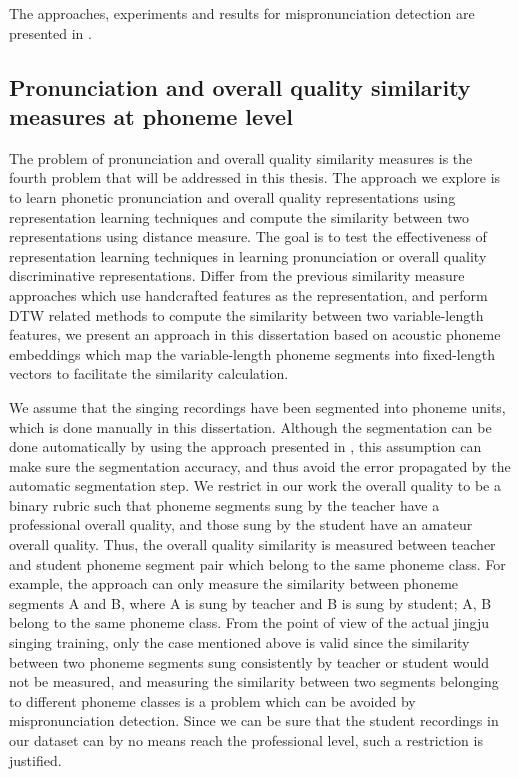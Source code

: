 The approaches, experiments and results for mispronunciation detection are presented in .

\subsection{Pronunciation and overall quality similarity measures at phoneme level}\label{sec:ch3:similarity_formulation}

The problem of pronunciation and overall quality similarity measures is the fourth problem that will be addressed in this thesis. The approach we explore is to learn phonetic pronunciation and overall quality representations using representation learning techniques and compute the similarity between two representations using distance measure. The goal is to test the effectiveness of representation learning techniques in learning pronunciation or overall quality discriminative representations. Differ from the previous similarity measure approaches which use handcrafted features as the representation, and perform \gls{DTW} related methods to compute the similarity between two variable-length features, we present an approach in this dissertation based on acoustic phoneme embeddings which map the variable-length phoneme segments into fixed-length vectors to facilitate the similarity calculation.

We assume that the singing recordings have been segmented into phoneme units, which is done manually in this dissertation. Although the segmentation can be done automatically by using the approach presented in , this assumption can make sure the segmentation accuracy, and thus avoid the error propagated by the automatic segmentation step. We restrict in our work the overall quality to be a binary rubric such that phoneme segments sung by the teacher have a professional overall quality, and those sung by the student have an amateur overall quality. Thus, the overall quality similarity is measured between teacher and student phoneme segment pair which belong to the same phoneme class. For example, the approach can only measure the similarity between phoneme segments A and B, where A is sung by teacher and B is sung by student; A, B belong to the same phoneme class. From the point of view of the actual jingju singing training, only the case mentioned above is valid since the similarity between two phoneme segments sung consistently by teacher or student would not be measured, and measuring the similarity between two segments belonging to different phoneme classes is a problem which can be avoided by mispronunciation detection. Since we can be sure that the student recordings in our dataset can by no means reach the professional level, such a restriction is justified.


